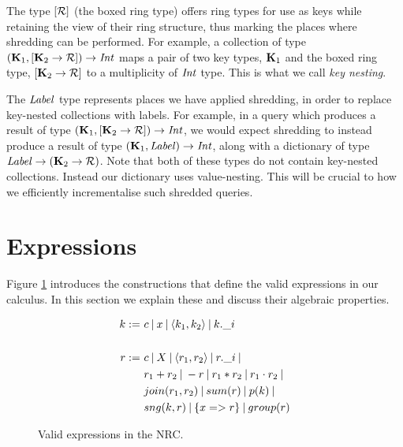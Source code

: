 {{{The type $[\mathcal{R}]$ (the boxed ring type) offers ring types for use as keys while retaining the view of their ring structure, thus marking the places where shredding can be performed. For example, a collection of type $(\mathbf{K}_1,[\mathbf{K}_2 \rightarrow \mathcal{R}]) \rightarrow \textrm{\textit{Int}}$ maps a pair of two key types, $\mathbf{K}_1$ and the boxed ring type, $[\mathbf{K}_2 \rightarrow \mathcal{R}]$ to a multiplicity of $\textrm{\textit{Int}}$ type. This is what we call \textit{key nesting}. 

The $\textrm{\textit{Label}}$ type represents places we have applied shredding, in order to replace key-nested collections with labels. For example, in a query which produces a result of type  $(\mathbf{K}_1,[\mathbf{K}_2 \rightarrow \mathcal{R}]) \rightarrow \textrm{\textit{Int}}$, we would expect shredding to instead produce a result of type 
$(\mathbf{K}_1,\textrm{\textit{Label}}) \rightarrow \textrm{\textit{Int}}$, along with a dictionary of type $\textrm{\textit{Label}} \rightarrow (\mathbf{K}_2 \rightarrow \mathcal{R})$. Note that both of these types do not contain key-nested collections. Instead our dictionary uses value-nesting. This will be crucial to how we efficiently incrementalise such shredded queries.

}

\section{Expressions} \label{nrcexprsection}

Figure \ref{nrcexprs} introduces the constructions that define the valid expressions in our calculus. In this section we explain these and discuss their algebraic properties.

\begin{figure}
\begin{equation*}
\begin{split}
k := \ & c \: | \: x \: | \: \langle k_1, k_2 \rangle \: | \: k.\_i \\ \\
r := \ & c \: | \: X \: | \: \langle r_1, r_2 \rangle \: | \: r.\_i \: | \: \\
& r_1 + r_2 \: | \: -r \: | \: r_1 \ast r_2 \: | \: r_1 \cdot r_2 \: | \: \\
& join(r_1,r_2) \: | \: sum(r) \: | \: p(k) \: | \: \\
& sng(k,r) \: | \: \{ x => r \} \: | \: group(r)
\end{split}
\end{equation*}
\caption{Valid expressions in the NRC.}
\label{nrcexprs}
\end{figure}

}}
